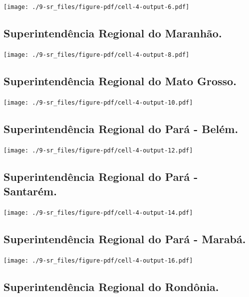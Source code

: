 \documentclass[
  letterpaper,
]{report}
\begin{document}
\texttt{[image: ./9-sr\_files/figure-pdf/cell-4-output-6.pdf]}

\hypertarget{superintenduxeancia-regional-do-maranhuxe3o.}{%
\subsection{Superintendência Regional do
Maranhão.}\label{superintenduxeancia-regional-do-maranhuxe3o.}}

\texttt{[image: ./9-sr\_files/figure-pdf/cell-4-output-8.pdf]}

\hypertarget{superintenduxeancia-regional-do-mato-grosso.}{%
\subsection{Superintendência Regional do Mato
Grosso.}\label{superintenduxeancia-regional-do-mato-grosso.}}

\texttt{[image: ./9-sr\_files/figure-pdf/cell-4-output-10.pdf]}

\hypertarget{superintenduxeancia-regional-do-paruxe1---beluxe9m.}{%
\subsection{Superintendência Regional do Pará -
Belém.}\label{superintenduxeancia-regional-do-paruxe1---beluxe9m.}}

\texttt{[image: ./9-sr\_files/figure-pdf/cell-4-output-12.pdf]}

\hypertarget{superintenduxeancia-regional-do-paruxe1---santaruxe9m.}{%
\subsection{Superintendência Regional do Pará -
Santarém.}\label{superintenduxeancia-regional-do-paruxe1---santaruxe9m.}}

\texttt{[image: ./9-sr\_files/figure-pdf/cell-4-output-14.pdf]}

\hypertarget{superintenduxeancia-regional-do-paruxe1---marabuxe1.}{%
\subsection{Superintendência Regional do Pará -
Marabá.}\label{superintenduxeancia-regional-do-paruxe1---marabuxe1.}}

\texttt{[image: ./9-sr\_files/figure-pdf/cell-4-output-16.pdf]}

\hypertarget{superintenduxeancia-regional-do-ronduxf4nia.}{%
\subsection{Superintendência Regional do
Rondônia.}\label{superintenduxeancia-regional-do-ronduxf4nia.}}
\end{document}
